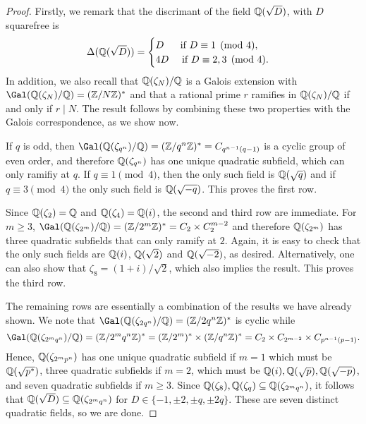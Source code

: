 \begin{proof}
    Firstly, we remark that the discrimant of the field $\mathbb{Q}(\sqrt{D})$, with $D$ squarefree is
    \begin{equation}
        \Delta(\mathbb{Q}(\sqrt{D}))=
        \begin{cases}
            D \ \quad\text{  if } D\equiv1\pmod{4},\\
            4D \quad\text{ if } D\equiv2,3\pmod{4}.
        \end{cases}
    \end{equation}
    In addition, we also recall that $\mathbb{Q}(\zeta_N)/\mathbb{Q}$ is a Galois extension with $\Gal(\QQ(\zeta_N)/\QQ)=(\ZZ/N\ZZ)^*$ and that a rational prime $r$ ramifies in $\mathbb{Q}(\zeta_N)/\mathbb{Q}$ if and only if $r\mid N$. The result follows by combining these two properties with the Galois correspondence, as we show now.

    If $q$ is odd, then $\Gal(\QQ(\zeta_{q^n})/\QQ)=(\ZZ/q^n\ZZ)^*=C_{q^{n-1}(q-1)}$ is a cyclic group of even order, and therefore $\mathbb{Q}(\zeta_{q^n})$ has one unique quadratic subfield, which can only ramifiy at $q$. If $q\equiv1\pmod{4}$, then the only such field is $\mathbb{Q}(\sqrt{q})$ and if $q\equiv3\pmod{4}$ the only such field is $\mathbb{Q}(\sqrt{-q})$. This proves the first row. 

    Since $\mathbb{Q}(\zeta_2)=\mathbb{Q}$ and $\mathbb{Q}(\zeta_4)=\mathbb{Q}(i)$, the second and third row are immediate. For $m\geq3$, $\Gal(\QQ(\zeta_{2^m})/\QQ)=(\ZZ/2^m\ZZ)^*=C_2\times C_2^{m-2}$ and therefore $\mathbb{Q}(\zeta_{2^m})$ has three quadratic subfields that can only ramify at $2$. Again, it is easy to check that the only such fields are $\mathbb{Q}(i)$, $\mathbb{Q}(\sqrt{2})$ and $\mathbb{Q}(\sqrt{-2})$, as desired. Alternatively, one can also show that $\zeta_8=(1+i)/\sqrt{2}$, which also implies the result. This proves the third row.

    The remaining rows are essentially a combination of the results we have already shown. We note that $\Gal(\QQ(\zeta_{2q^n})/\QQ)=(\ZZ/2q^n\ZZ)^*$ is cyclic while 
    $$\Gal(\QQ(\zeta_{2^mq^n})/\QQ)=(\ZZ/2^mq^n\ZZ)^*=(\ZZ/2^m)^*\times(\ZZ/q^n\ZZ)^*=C_2\times C_{2^{m-2}}\times C_{p^{n-1}(p-1)}.$$
    Hence, $\mathbb{Q}(\zeta_{2^mp^n})$ has one unique quadratic subfield if $m=1$ which must be $\mathbb{Q}(\sqrt{p^*})$, three quadratic subfields if $m=2$, which must be $\mathbb{Q}(i),\mathbb{Q}(\sqrt{p}),\mathbb{Q}(\sqrt{-p})$, and seven quadratic subfields if $m\geq 3$. Since $\mathbb{Q}(\zeta_8),\mathbb{Q}(\zeta_q)\subseteq\mathbb{Q}(\zeta_{2^mq^n})$, it follows that $\mathbb{Q}(\sqrt{D})\subseteq\mathbb{Q}(\zeta_{2^mq^n})$ for $D\in\{-1,\pm2,\pm q,\pm 2q\}$. These are seven distinct quadratic fields, so we are done.
\end{proof}

